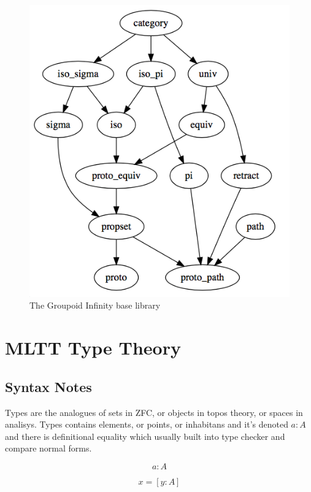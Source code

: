 \documentclass{svproc}
\begin{document}
\begin{figure}[h]
  \centerline{\includegraphics[scale=0.26]{baselib}}
  \caption{The Groupoid Infinity base library}
\end{figure}

\newpage
\section{MLTT Type Theory}

\subsection{Syntax Notes}

Types are the analogues of sets in ZFC, or objects in topos theory, or spaces in analisys.
Types contains elements, or points, or inhabitans and it's denoted $a : A$ and there
is definitional equality which usually built into type checker and compare normal forms.

\begin{equation}
\tag{terms and types}
a : A
\end{equation}

\begin{equation}
\tag{definitional equality}
x = [ y : A ]
\end{equation}
\end{document}

